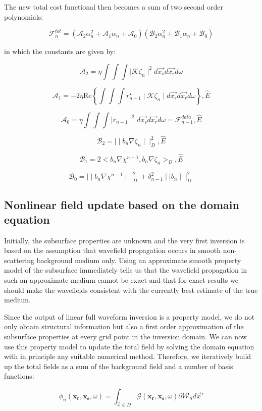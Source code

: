 \documentclass[10pt,a4paper]{article}
\newcommand{\real}[1]{\text{Re} \left\{ #1 \right\}}
\begin{document}
The new total cost functional then becomes a sum of two second order polynomials:

\[ \mathcal{F}^{tot}_n = (\mathcal{A}_2\alpha^{2}_n + \mathcal{A}_1\alpha_n +\mathcal{A}_0)(\mathcal{B}_2\alpha^{2}_n + \mathcal{B}_1\alpha_n + \mathcal{B}_0) \]

in which the constants are given by:

\[ \mathcal{A}_2 = \eta \int \int \int \mid \mathcal{K} \zeta_n \mid^2 d\vec{x_s}d\vec{x_r}d\omega \]

\[ \mathcal{A}_1 = -2 \eta \real{\int \int \int r^{\star}_{n-1} \mid \mathcal{K} \zeta_n \mid d\vec{x_s}d\vec{x_r}d\omega} , \hat{E} \]

\[ \mathcal{A}_0 = \eta \int \int \int \mid r_{n-1} \mid^2 d\vec{x_s}d\vec{x_r}d\omega =  \mathcal{F}^{data}_{n-1} , \hat{E} \]

\[ \mathcal{B}_2 = \mid \mid b_n \nabla \zeta_n \mid \mid^{2}_D , \hat{E} \]

\[ \mathcal{B}_1 = 2 < b_n \nabla\chi^{n-1}, b_n \nabla \zeta_n >_D, \hat{E} \]

\[ \mathcal{B}_0 = \mid \mid b_n \nabla \chi^{n-1} \mid \mid^{2}_D + \delta^{2}_{n-1} \mid \mid b_n \mid \mid^{2}_D \]

\subsection{Nonlinear field update based on the domain equation}

Initially, the subsurface properties are unknown  and the very first inversion is based on the assumption that wavefield propagation occurs in smooth non-scattering background medium only. Using an approximate smooth property model of the subsurface immediately tells us that the wavefield propagation in such an approximate medium cannot be exact and that for exact results we should make the wavefields consistent with the currently best estimate of the true medium.

Since the output of linear full waveform inversion is a property model, we do
not only obtain structural information but also a first order approximation of the subsurface properties at every grid point in the inversion domain. We can now use this property model to update the total field by solving the domain equation with in principle any suitable numerical method. Therefore, we iteratively build up the total fields as a sum of the background field and a number of basis functions:

\[ \phi_n (\mathbf{x_\text{r}},\mathbf{x_\text{s}},\omega) = \int_{\vec{x}\in D} \mathcal{G} (\mathbf{x_\text{r}},\mathbf{x_\text{s}},\omega)\partial \mathcal{W}_n d\vec{x}' \]
\end{document}
